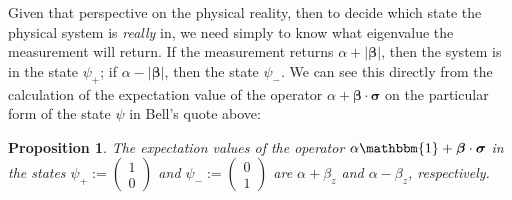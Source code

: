 \documentclass[12pt]{article}
\newtheorem{prop}[thm]{Proposition}
\begin{document}
Given that perspective on the physical reality, then to decide which
state the physical system is \emph{really} in, we need simply to know
what eigenvalue the measurement will return. If the measurement
returns $\alpha + |\bm{\beta}|$, then the system is in the state
$\psi_{+}$; if $\alpha - |\bm{\beta}|$, then the state $\psi_{-}$. We
can see this directly from the calculation of the expectation value of
the operator $\alpha + \bm{\beta} \cdot \bm{\sigma}$ on the particular
form of the state $\psi$ in Bell's quote above:

\begin{prop}
  The expectation values of the operator $\alpha \mathbbm{1} +
  \bm{\beta} \cdot \bm{\sigma}$ in the states $\psi_{+}
  := \begin{pmatrix} 1 \\ 0 \end{pmatrix}$ and $\psi_{-}
  := \begin{pmatrix} 0 \\ 1 \end{pmatrix}$ are $\alpha + \beta_z$ and
  $\alpha - \beta_z$, respectively.
\end{prop}
\end{document}
